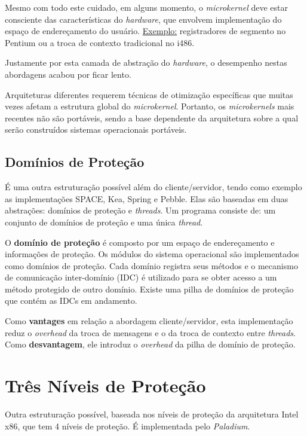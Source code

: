 Mesmo com todo este cuidado, em alguns momento, o \textit{microkernel} deve estar consciente das características do \textit{hardware}, que envolvem implementação do espaço de endereçamento do usuário. \underline{Exemplo:} registradores de segmento no Pentium ou a troca de contexto tradicional no i486.

Justamente por esta camada de abstração do \textit{hardware}, o desempenho nestas abordagens acabou por ficar lento.

Arquiteturas diferentes requerem técnicas de otimização específicas que muitas vezes afetam a estrutura global do \textit{microkernel}. Portanto, os \textit{microkernels} mais recentes não são portáveis, sendo a base dependente da arquitetura sobre a qual serão construídos sistemas operacionais portáveis.




\subsection{Domínios de Proteção}
É uma outra estruturação possível além do cliente/servidor, tendo como exemplo as implementações SPACE, Kea, Spring e Pebble. Elas são baseadas em duas abstrações: domínios de proteção e \textit{threads}. Um programa consiste de: um conjunto de domínios de proteção e uma única \textit{thread}.

O \textbf{domínio de proteção} é composto por um espaço de endereçamento e informações de proteção. Os módulos do sistema operacional são implementados como domínios de proteção. Cada domínio registra seus métodos e o mecanismo de comunicação inter-domínio (IDC) é utilizado para se obter acesso a um método protegido de outro domínio. Existe uma pilha de domínios de proteção que contém as IDCs em andamento.

Como \textbf{vantages} em relação a abordagem cliente/servidor, esta implementação reduz o \textit{overhead} da troca de mensagens e o da troca de contexto entre \textit{threads}. Como \textbf{desvantagem}, ele introduz o \textit{overhead} da pilha de domínio de proteção.






\section{Três Níveis de Proteção}
Outra estruturação possível, baseada nos níveis de proteção da arquitetura Intel x86, que tem 4 níveis de proteção. É implementada pelo \textit{Paladium}.

